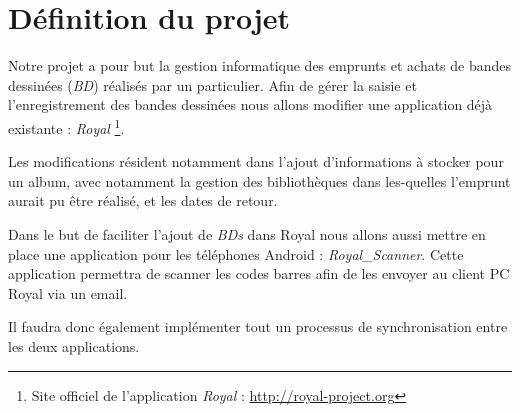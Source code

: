 \documentclass[etudiants]{support-iutrs}
\begin{document}
\header
\section*{Définition du projet}

Notre projet a pour but la gestion informatique des emprunts et achats de bandes dessinées (\emph{BD}) réalisés par un particulier.
Afin de gérer la saisie et l’enregistrement des bandes dessinées nous allons modifier une application déjà existante : \emph{Royal}
\footnote{Site officiel de l'application \emph{Royal} : \url{http://royal-project.org}}.

Les modifications résident notamment dans l'ajout d'informations à stocker pour un album, avec notamment la gestion des bibliothèques dans les-quelles l'emprunt aurait pu être réalisé, et les dates de retour. 

Dans le but de faciliter l'ajout de \emph{BDs} dans Royal nous allons aussi mettre en place une application pour les téléphones Android : \emph{Royal\_Scanner}.
Cette application permettra de scanner les codes barres afin de les envoyer au client PC Royal via un email.

Il faudra donc également implémenter tout un processus de synchronisation entre les deux applications. 
\end{document}
